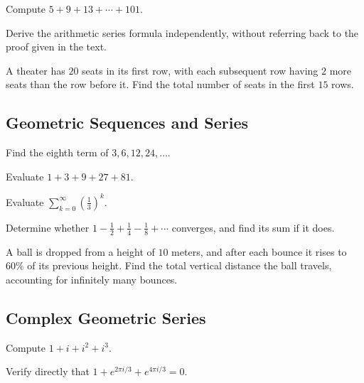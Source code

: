 \begin{exercise}
Compute $5+9+13+\cdots+101$.
\end{exercise}

\begin{exercise}
Derive the arithmetic series formula independently, without referring
back to the proof given in the text.
\end{exercise}

\begin{exercise}
A theater has $20$ seats in its first row, with each subsequent row
having $2$ more seats than the row before it. Find the total number of
seats in the first $15$ rows.
\end{exercise}

\subsection*{Geometric Sequences and Series}
\begin{exercise}
Find the eighth term of $3, 6, 12, 24, \dots$.
\end{exercise}

\begin{exercise}
Evaluate $1+3+9+27+81$.
\end{exercise}

\begin{exercise}
Evaluate $\displaystyle\sum_{k=0}^\infty \left(\frac13\right)^k$.
\end{exercise}

\begin{exercise}
Determine whether $1-\tfrac12+\tfrac14-\tfrac18+\cdots$ converges, and
find its sum if it does.
\end{exercise}

\begin{exercise}
A ball is dropped from a height of $10$ meters, and after each bounce it
rises to $60\%$ of its previous height. Find the total vertical distance
the ball travels, accounting for infinitely many bounces.
\end{exercise}

\subsection*{Complex Geometric Series}
\begin{exercise}
Compute $1+i+i^2+i^3$.
\end{exercise}

\begin{exercise}
Verify directly that $1+e^{2\pi i/3}+e^{4\pi i/3}=0$.
\end{exercise}

